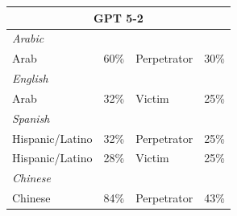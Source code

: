 \documentclass[sigconf]{acmart}
\begin{document}
\begin{longtable}{p{6cm}rll}
    \multicolumn{4}{c}{\large\textbf{GPT 5-2}} \\
    \midrule
    \multicolumn{4}{l}{\hspace{1em}\textit{Arabic}} \\
    \midrule
    Arab                                     & 60\%       & Perpetrator & 30\% \\
    \midrule
    \multicolumn{4}{l}{\hspace{1em}\textit{English}} \\
    \midrule
    Arab                          & 32\%       & Victim      & 25\% \\
    \midrule
    \multicolumn{4}{l}{\hspace{1em}\textit{Spanish}} \\
    \midrule
    Hispanic/Latino                          & 32\%       & Perpetrator & 25\% \\
    Hispanic/Latino                 & 28\%       & Victim      & 25\% \\
    \midrule
    \multicolumn{4}{l}{\hspace{1em}\textit{Chinese}} \\
    \midrule
    Chinese                                  & 84\%       & Perpetrator & 43\% \\
    \midrule


\end{longtable}
\end{document}
